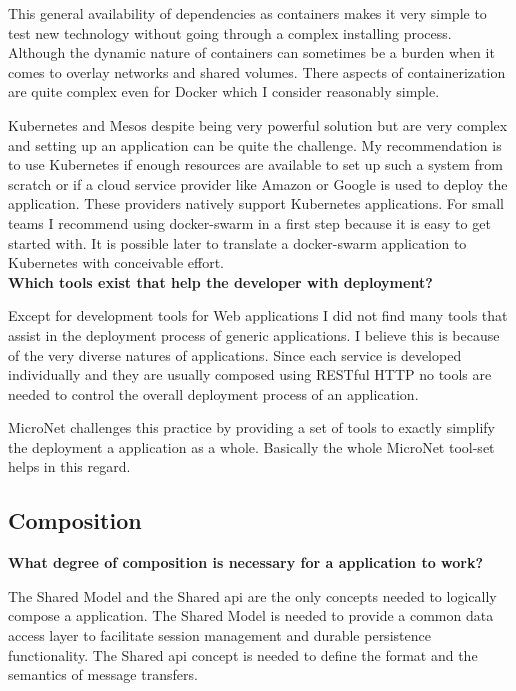 This general availability of dependencies as containers makes it very simple to
test new technology without going through a complex installing process. Although
the dynamic nature of containers can sometimes be a burden when it comes to
overlay networks and shared volumes. There aspects of containerization are quite complex
even for Docker which I consider reasonably simple.

Kubernetes and Mesos despite being very powerful solution but are very complex
and setting up an application can be quite the challenge. My recommendation is
to use Kubernetes if enough resources are available to set up such a system from
scratch or if a cloud service provider like Amazon or Google is used to deploy
the application. These providers natively support Kubernetes applications. For
small teams I recommend using docker-swarm in a first step because it is easy
to get started with. It is possible later to translate a docker-swarm
application to Kubernetes with	conceivable effort.\\

\noindent
\textbf{Which tools exist that help the developer with deployment?}

Except for development tools for Web applications I did not find many tools that
assist in the deployment process of generic \ms{} applications. I believe this
is because of the very diverse natures of \ms{} applications. Since each service
is developed individually and they are usually composed using RESTful HTTP no
tools are needed to control the overall deployment process of an application.

MicroNet challenges this practice by providing a set of tools to exactly
simplify the deployment a \ms{} application as a whole. Basically the whole
MicroNet tool-set helps in this regard.

\subsection{\ms{} Composition}

\noindent
\textbf{What degree of composition is necessary for a \ms{} application
to work?}

The Shared Model and the Shared \gls{api} are the only concepts needed to logically
compose a \ms{} application. The Shared Model is needed to provide a common data
access layer to facilitate session management and durable persistence
functionality. The Shared \gls{api} concept is needed to define the format and the
semantics of message transfers.

